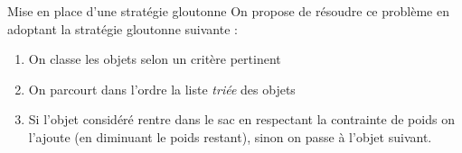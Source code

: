 \documentclass[10pt]{beamer}
\begin{document}
\begin{frame}[fragile]{\Ctitle}{\stitle}
	\begin{block}{Mise en place d'une stratégie gloutonne}
		On propose de résoudre ce problème en adoptant la stratégie gloutonne suivante :
		\begin{enumerate}
			\item<1-> On classe les objets selon un critère pertinent\\
			\onslide<2->{\textcolor{gray}{\small Ici la valeur par unité de poids semble un critère intéressant}}
			\item<3-> On parcourt dans l'ordre la liste \textit{triée} des objets
			\item<4-> Si l'objet considéré rentre dans le sac en respectant la contrainte de poids on l'ajoute (en diminuant le poids restant), sinon on passe à l'objet suivant.
		\end{enumerate}
	\end{block}
\end{frame}
\end{document}
